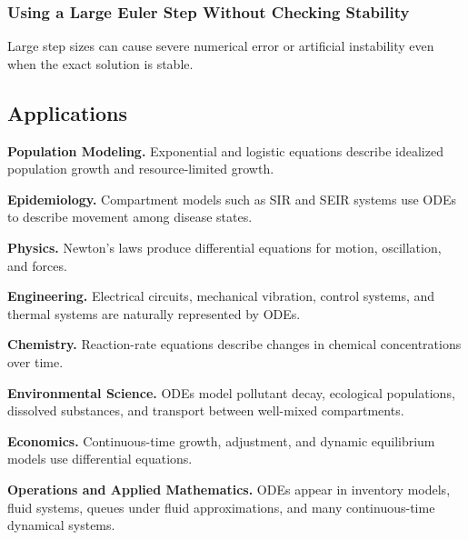 \subsubsection{Using a Large Euler Step Without Checking Stability}

Large step sizes can cause severe numerical error or artificial
instability even when the exact solution is stable.

\subsection{Applications}
\label{subsec:ode-applications}

\begin{applicationbox}

\textbf{Population Modeling.}
Exponential and logistic equations describe idealized population growth
and resource-limited growth.

\medskip

\textbf{Epidemiology.}
Compartment models such as SIR and SEIR systems use ODEs to describe
movement among disease states.

\medskip

\textbf{Physics.}
Newton's laws produce differential equations for motion, oscillation, and
forces.

\medskip

\textbf{Engineering.}
Electrical circuits, mechanical vibration, control systems, and thermal
systems are naturally represented by ODEs.

\medskip

\textbf{Chemistry.}
Reaction-rate equations describe changes in chemical concentrations over
time.

\medskip

\textbf{Environmental Science.}
ODEs model pollutant decay, ecological populations, dissolved substances,
and transport between well-mixed compartments.

\medskip

\textbf{Economics.}
Continuous-time growth, adjustment, and dynamic equilibrium models use
differential equations.

\medskip

\textbf{Operations and Applied Mathematics.}
ODEs appear in inventory models, fluid systems, queues under fluid
approximations, and many continuous-time dynamical systems.

\end{applicationbox}

